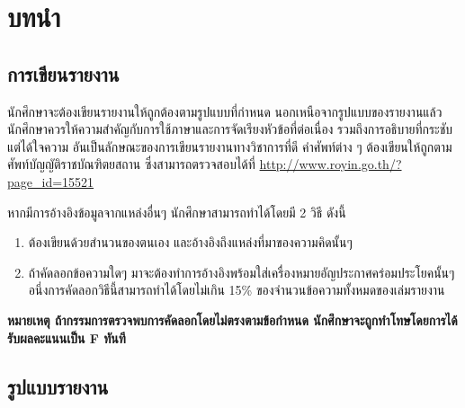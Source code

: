 \chapter{บทนำ}
\label{chapter:introduction}

\section{การเขียนรายงาน}

นักศึกษาจะต้องเขียนรายงานให้ถูกต้องตามรูปแบบที่กำหนด นอกเหนือจากรูปแบบของรายงานแล้ว นักศึกษาควรให้ความสำคัญกับการใช้ภาษาและการจัดเรียงหัวข้อที่ต่อเนื่อง รวมถึงการอธิบายที่กระชับแต่ได้ใจความ อันเป็นลักษณะของการเขียนรายงานทางวิชาการที่ดี คำศัพท์ต่าง ๆ ต้องเขียนให้ถูกตามศัพท์บัญญัติราชบัณฑิตยสถาน ซึ่งสามารถตรวจสอบได้ที่ \url{http://www.royin.go.th/?page_id=15521}

หากมีการอ้างอิงข้อมูลจากแหล่งอื่นๆ นักศึกษาสามารถทำได้โดยมี 2 วิธี ดังนี้
\begin{enumerate}
    \item ต้องเขียนด้วยสำนวนของตนเอง และอ้างอิงถึงแหล่งที่มาของความคิดนั้นๆ
    \item ถ้าคัดลอกข้อความใดๆ มาจะต้องทำการอ้างอิงพร้อมใส่เครื่องหมายอัญประกาศคร่อมประโยคนั้นๆอนึ่งการคัดลอกวิธีนี้สามารถทำได้โดยไม่เกิน 15\% ของจำนวนข้อความทั้งหมดของเล่มรายงาน
\end{enumerate}

\textbf{หมายเหตุ ถ้ากรรมการตรวจพบการคัดลอกโดยไม่ตรงตามข้อกำหนด นักศึกษาจะถูกทำโทษโดยการได้รับผลคะแนนเป็น F ทันที}

\section{รูปแบบรายงาน}
